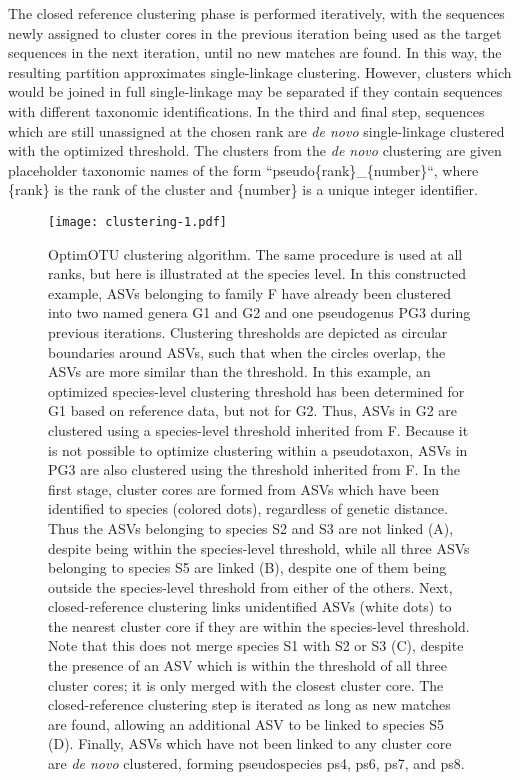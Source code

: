 \documentclass[
]{article}
\begin{document}
The closed reference clustering phase is performed iteratively, with the sequences newly assigned to cluster cores in the previous iteration being used as the target sequences in the next iteration, until no new matches are found.
In this way, the resulting partition approximates single-linkage clustering.
However, clusters which would be joined in full single-linkage may be separated if they contain sequences with different taxonomic identifications.
In the third and final step, sequences which are still unassigned at the chosen rank are \emph{de novo} single-linkage clustered with the optimized threshold.
The clusters from the \emph{de novo} clustering are given placeholder taxonomic names of the form ``pseudo\{rank\}\_\{number\}``, where \{rank\} is the rank of the cluster and \{number\} is a unique integer identifier.















\begin{figure}
\centering
\texttt{[image: clustering-1.pdf]}
\caption{\label{fig:clustering}OptimOTU clustering algorithm.
The same procedure is used at all ranks, but here is illustrated at the species level.
In this constructed example, ASVs belonging to family F have already been clustered into two named genera G1 and G2 and one pseudogenus PG3 during previous iterations.
Clustering thresholds are depicted as circular boundaries around ASVs, such that when the circles overlap, the ASVs are more similar than the threshold.
In this example, an optimized species-level clustering threshold has been determined for G1 based on reference data, but not for G2.
Thus, ASVs in G2 are clustered using a species-level threshold inherited from F.
Because it is not possible to optimize clustering within a pseudotaxon, ASVs in PG3 are also clustered using the threshold inherited from F.
In the first stage, cluster cores are formed from ASVs which have been identified to species (colored dots), regardless of genetic distance.
Thus the ASVs belonging to species S2 and S3 are not linked (A), despite being within the species-level threshold, while all three ASVs belonging to species S5 are linked (B), despite one of them being outside the species-level threshold from either of the others.
Next, closed-reference clustering links unidentified ASVs (white dots) to the nearest cluster core if they are within the species-level threshold.
Note that this does not merge species S1 with S2 or S3 (C), despite the presence of an ASV which is within the threshold of all three cluster cores; it is only merged with the closest cluster core.
The closed-reference clustering step is iterated as long as new matches are found, allowing an additional ASV to be linked to species S5 (D).
Finally, ASVs which have not been linked to any cluster core are \emph{de novo} clustered, forming pseudospecies ps4, ps6, ps7, and ps8.}
\end{figure}
\end{document}
